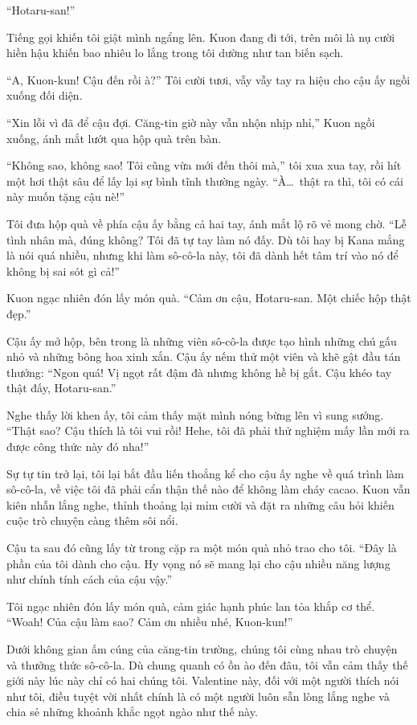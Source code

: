 \documentclass[../main.tex]{subfiles}
\begin{document}
``Hotaru-san!''

Tiếng gọi khiến tôi giật mình ngẩng lên. Kuon đang đi tới, trên môi là nụ cười hiền hậu khiến bao nhiêu lo lắng trong tôi dường như tan biến sạch.

``A, Kuon-kun! Cậu đến rồi à?'' Tôi cười tươi, vẫy vẫy tay ra hiệu cho cậu ấy ngồi xuống đối diện.

``Xin lỗi vì đã để cậu đợi. Căng-tin giờ này vẫn nhộn nhịp nhỉ,'' Kuon ngồi xuống, ánh mắt lướt qua hộp quà trên bàn.

``Không sao, không sao! Tôi cũng vừa mới đến thôi mà,'' tôi xua xua tay, rồi hít một hơi thật sâu để lấy lại sự bình tĩnh thường ngày. ``À\dots\ thật ra thì, tôi có cái này muốn tặng cậu nè!''

Tôi đưa hộp quà về phía cậu ấy bằng cả hai tay, ánh mắt lộ rõ vẻ mong chờ. ``Lễ tình nhân mà, đúng không? Tôi đã tự tay làm nó đấy. Dù tôi hay bị Kana mắng là nói quá nhiều, nhưng khi làm sô-cô-la này, tôi đã dành hết tâm trí vào nó để không bị sai sót gì cả!''

Kuon ngạc nhiên đón lấy món quà. ``Cảm ơn cậu, Hotaru-san. Một chiếc hộp thật đẹp.''

Cậu ấy mở hộp, bên trong là những viên sô-cô-la được tạo hình những chú gấu nhỏ và những bông hoa xinh xắn. Cậu ấy nếm thử một viên và khẽ gật đầu tán thưởng: ``Ngon quá! Vị ngọt rất đậm đà nhưng không hề bị gắt. Cậu khéo tay thật đấy, Hotaru-san.''

Nghe thấy lời khen ấy, tôi cảm thấy mặt mình nóng bừng lên vì sung sướng. ``Thật sao? Cậu thích là tôi vui rồi! Hehe, tôi đã phải thử nghiệm mấy lần mới ra được công thức này đó nha!''

Sự tự tin trở lại, tôi lại bắt đầu liến thoắng kể cho cậu ấy nghe về quá trình làm sô-cô-la, về việc tôi đã phải cẩn thận thế nào để không làm cháy cacao. Kuon vẫn kiên nhẫn lắng nghe, thỉnh thoảng lại mỉm cười và đặt ra những câu hỏi khiến cuộc trò chuyện càng thêm sôi nổi.

Cậu ta sau đó cũng lấy từ trong cặp ra một món quà nhỏ trao cho tôi. ``Đây là phần của tôi dành cho cậu. Hy vọng nó sẽ mang lại cho cậu nhiều năng lượng như chính tính cách của cậu vậy.''

Tôi ngạc nhiên đón lấy món quà, cảm giác hạnh phúc lan tỏa khắp cơ thể. ``Woah! Của cậu làm sao? Cảm ơn nhiều nhé, Kuon-kun!''

Dưới không gian ấm cúng của căng-tin trường, chúng tôi cùng nhau trò chuyện và thưởng thức sô-cô-la. Dù chung quanh có ồn ào đến đâu, tôi vẫn cảm thấy thế giới này lúc này chỉ có hai chúng tôi. Valentine này, đối với một người thích nói như tôi, điều tuyệt vời nhất chính là có một người luôn sẵn lòng lắng nghe và chia sẻ những khoảnh khắc ngọt ngào như thế này.
\end{document}

